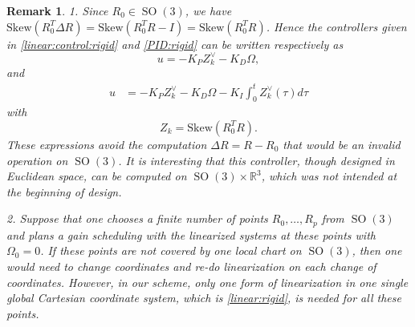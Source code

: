 \documentclass[letterpaper, 10 pt, conference]{ieeeconf}  %
\newtheorem{remark}[theorem]{Remark}
\newcommand{\Skew}{\mathrm{Skew}}
\newcommand{\SO}{\operatorname{SO}(3)}
\begin{document}
\begin{remark}{\rm
1. Since $R_0 \in \SO$, we have $\Skew (R_0^T\Delta R) = \Skew (R_0^T R - I) = \Skew (R_0^TR)$. Hence the controllers given in \eqref{linear:control:rigid} and \eqref{PID:rigid} can be written respectively as
\[
u = -K_P Z_k^\vee - K_D\Omega,
\]
and 
\begin{align*}
u &= -K_P  Z_k^\vee   - K_D\Omega - K_I \int_0^t Z_k^\vee(\tau)  d\tau
\end{align*}
with
\[
Z_k = \Skew(R_0^T R).
\]
These expressions avoid the computation $\Delta R = R-R_0$ that would be  an invalid operation on $\SO$.
It is interesting that this controller, though designed in Euclidean space, can be computed on $\SO \times \mathbb R^3$, which was not intended at the beginning of design.

2. Suppose that one chooses a finite number of points $R_0, \ldots, R_p$   from $\SO$ and plans a gain scheduling with the linearized systems at these points with $\Omega_0 = 0$.  If these points are not covered by one local chart on $\SO$, then one would need to change coordinates and re-do linearization on each change of coordinates. However,  in our scheme, only one form of  linearization in one single global Cartesian coordinate system, which is \eqref{linear:rigid}, is needed for all these points.
}\end{remark}
\end{document}
